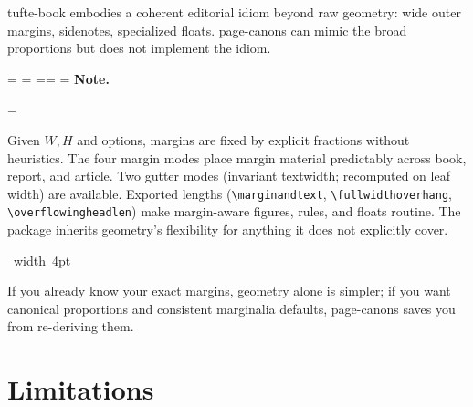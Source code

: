 \documentclass[11pt, twoside, openany]{book}
\makeatletter
\newcommand{\pkg}[1]{\textsf{#1}}
\newcommand{\cmd}[1]{\texttt{\textbackslash #1}}
\newcommand*{\cns@tag@artifact@begin}{}
\newcommand*{\cns@tag@artifact@end}{}
\newenvironment{TodoNote}[1][]{%
  \par\addvspace{0.5\baselineskip plus 2pt}%
  \setbox\cns@box=\vbox\bgroup
    \hsize=\linewidth
    \advance\hsize -10pt
    \linewidth=\hsize \columnwidth=\hsize
    \parindent=\z@
    \noindent\textbf{\sffamily Note\cns@ifnotempty{#1}{ \textmd{(#1)}}.}%
    \par\nobreak
    \@afterindentfalse\@afterheading
    \leftskip=\cns@indent\relax
    \ignorespaces
}{%
  \par
  \egroup
  \vbox{\hbox{%
    \cns@tag@artifact@begin\vrule width 4pt\cns@tag@artifact@end
    \hskip 6pt\relax
    \box\cns@box
  }}%
  \par\addvspace{0.5\baselineskip plus 2pt}%
}
\makeatother
\begin{document}
\pkg{tufte-book} \cite{tufte-latex} embodies a coherent editorial idiom beyond raw geometry: wide outer margins, sidenotes, specialized floats. \pkg{page-canons} can mimic the broad proportions but does not implement the idiom.

\begin{TodoNote}
	Given $W,H$ and options, margins are fixed by explicit fractions without heuristics. The four margin modes place margin material predictably across \pkg{book}, \pkg{report}, and \pkg{article}. Two gutter modes (invariant textwidth; recomputed on leaf width) are available. Exported lengths (\cmd{marginandtext}, \cmd{fullwidthoverhang}, \cmd{overflowingheadlen}) make margin-aware figures, rules, and floats routine. The package inherits \pkg{geometry}'s flexibility for anything it does not explicitly cover.
\end{TodoNote}

If you already know your exact margins, \pkg{geometry} alone is simpler; if you want canonical proportions and consistent marginalia defaults, \pkg{page-canons} saves you from re-deriving them.

\section{Limitations}\label{sec:limits}
\end{document}
